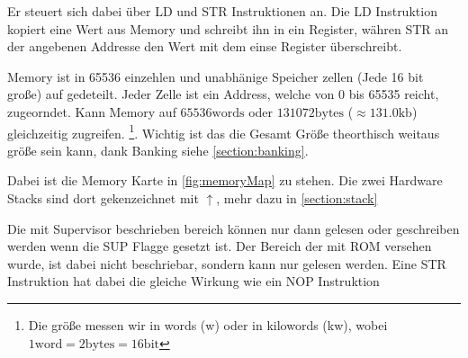 \documentclass{scrartcl}
\begin{document}
Er steuert sich dabei über LD und STR Instruktionen an. Die LD Instruktion kopiert eine Wert aus Memory und schreibt ihn in ein Register, währen STR an der angebenen Addresse den Wert mit dem einse Register überschreibt.

Memory ist in 65536 einzehlen und unabhänige Speicher zellen (Jede 16 bit große) auf gedeteilt. Jeder Zelle ist ein Address, welche von 0 bis 65535 reicht, zugeorndet. Kann Memory auf $65536 \text{words}$ oder $131072 \text{bytes}$ ($\approx 131.0 \text{kb}$) gleichzeitig zugreifen.
\footnote{Die größe messen wir in words (w) oder in kilowords (kw), wobei $1 \text{word} = 2 \text{bytes} = 16 \text{bit}$}. Wichtig ist das die Gesamt Größe theorthisch weitaus größe sein kann, dank Banking siehe \autoref{section:banking}.

Dabei ist die Memory Karte in \autoref{fig:memoryMap} zu stehen. Die zwei Hardware Stacks sind dort gekenzeichnet mit $\uparrow$, mehr dazu in \autoref{section:stack}

Die mit Supervisor beschrieben bereich können nur dann gelesen oder geschreiben werden wenn die SUP Flagge gesetzt ist. Der Bereich der mit ROM versehen wurde, ist dabei nicht beschriebar, sondern kann nur gelesen werden. Eine STR Instruktion hat dabei die gleiche Wirkung wie ein NOP Instruktion
\end{document}
